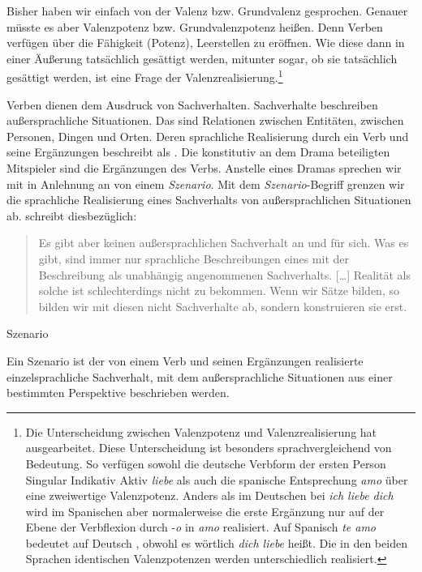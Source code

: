 Bisher haben wir einfach von der Valenz bzw. Grundvalenz gesprochen. Genauer müsste es aber Valenzpotenz bzw. Grundvalenzpotenz  heißen. Denn Verben verfügen über die Fähigkeit (Potenz), Leerstellen zu eröffnen. Wie diese dann in einer Äußerung tatsächlich gesättigt werden, mitunter sogar, ob sie tatsächlich gesättigt werden, ist eine Frage der Valenzrealisierung.\footnote{Die Unterscheidung zwischen Valenzpotenz und Valenzrealisierung hat \citet{Agel1995Valenz} ausgearbeitet. Diese Unterscheidung ist besonders sprachvergleichend von Bedeutung. So verfügen sowohl die deutsche Verbform der ersten Person Singular Indikativ Aktiv \textit{liebe} als auch die spanische Entsprechung \textit{amo} über eine zweiwertige Valenzpotenz. Anders als im Deutschen bei \textit{ich liebe dich} wird im Spanischen aber normalerweise die erste Ergänzung nur auf der Ebene der Verbflexion durch -\textit{o} in \textit{amo} realisiert. Auf Spanisch \textit{te amo} bedeutet auf Deutsch , obwohl es wörtlich \textit{dich liebe} heißt. Die in den beiden Sprachen identischen Valenzpotenzen werden unterschiedlich realisiert.}

Verben dienen dem Ausdruck von Sachverhalten. Sachverhalte beschreiben außersprachliche Situationen. Das sind Relationen zwischen Entitäten, \zB zwischen Personen, Dingen und Orten. Deren sprachliche Realisierung durch ein Verb und seine Ergänzungen beschreibt \citet[93]{Tesniere1980deutsch} als . Die konstitutiv an dem Drama beteiligten Mitspieler sind die Ergänzungen des Verbs. Anstelle eines Dramas sprechen wir mit \citet[39]{Agel2017} in Anlehnung an \citet[28]{Fischer2003} von einem \textit{Szenario}. Mit dem \textit{Szenario}-Begriff grenzen wir die sprachliche Realisierung eines Sachverhalts von außersprachlichen Situationen ab. 
\citet[96]{Welke2005} schreibt diesbezüglich: 

\begin{quote}
Es gibt aber keinen außersprachlichen Sachverhalt an und für sich. Was es gibt, sind immer nur sprachliche Beschreibungen eines mit der Beschreibung als unabhängig angenommenen Sachverhalts. [\ldots{}] Realität als solche ist schlechterdings nicht zu bekommen. Wenn wir Sätze bilden, so bilden wir mit diesen nicht Sachverhalte ab, sondern konstruieren sie erst. \citep[96]{Welke2005} 
\end{quote}


\begin{Definition}{Szenario}\label{Def:Szenario}
    
\noindent 
Ein Szenario ist der von einem Verb und seinen Ergänzungen realisierte einzelsprachliche Sachverhalt, mit dem außersprachliche Situationen aus einer bestimmten Perspektive beschrieben werden.  

\end{Definition}



